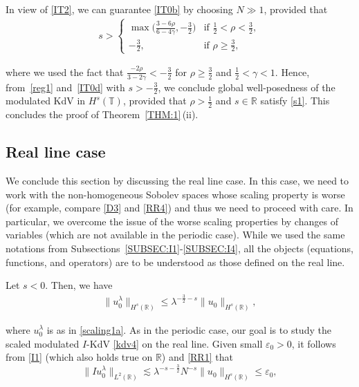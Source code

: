 \documentclass[letterpaper, 11pt,  reqno]{amsart}
\newcommand{\1}{\hspace{0.5mm}\text{I}\hspace{0.5mm}}
\newcommand{\noi}{\noindent}
\newcommand{\R}{\mathbb{R}}
\newcommand{\T}{\mathbb{T}}
\newcommand{\eps}{\varepsilon}
\newcommand{\g}{\gamma}
\newcommand{\ld}{\lambda}
\newcommand{\les}{\lesssim}
\numberwithin{equation}{section}
\numberwithin{theorem}{section}
\begin{document}
\noi
In view of  \eqref{IT2}, 
we  can  guarantee \eqref{IT0b} by choosing $N \gg 1$, 
provided that 
\begin{align}
s > 
\begin{cases}
\max \big(\frac {3-6\rho }{6 - 4\g}, - \frac 32\big)& \text{if } \frac 12 < \rho < \frac 32, \\
- \frac 32, & \text{if }  \rho \ge \frac 32, 
\end{cases}
\label{IT0d}
\end{align}

\noi
where we used the fact that 
$\frac{-2\rho}{3 - 2\g}  < -\frac 32$ for 
 $\rho \ge \frac 32$ and
$ \frac 12< \g < 1$.
Hence, 
from~\eqref{reg1} and~\eqref{IT0d} with $ s > - \frac 32$, 
we conclude 
global well-posedness of the modulated KdV in $H^s(\T)$, 
provided that 
$\rho > \frac 12$ and $s\in \R$
satisfy \eqref{s1}.
This concludes the proof of Theorem~\ref{THM:1}\,(ii).








\subsection{Real line case}
\label{SUBSEC:I5}


We conclude this section by discussing the real line case.
In this case, we need to work with the non-homogeneous Sobolev spaces whose
scaling property is worse
(for example, compare \eqref{D3} and \eqref{RR4})
and thus we need to proceed with care.
In particular, we overcome the issue of the worse scaling properties
by changes of variables
(which are not available in the periodic case).
While we used the same notations from Subsections~\ref{SUBSEC:I1}-\ref{SUBSEC:I4}, 
 all the objects 
(equations, functions, and operators) are 
to be understood as those defined on the real line.






Let $s < 0$.
Then, we have 
\begin{align}
\|u_0^\ld\|_{ H^s(\R)}
\le  \ld^{-\frac 32 - s} \|u_0\|_{ H^s(\R)}, 
\label{RR1}
\end{align}

\noi
where $u_0^\ld$ is as in \eqref{scaling1a}.
As in the periodic case, 
our goal is to study the scaled modulated $I$-KdV \eqref{kdv4}
on the real line.
Given small $\eps_0 > 0$, it follows from 
\eqref{I1} (which also holds true on $\R$)
and  \eqref{RR1} that
\begin{equation*}
 \| I  u_0^{\ld} \|_{L^2(\R) }
 \les \ld^{-s-\frac 32} N^{-s} \|  u_0  \|_{H^{s}(\R)}
 \le \eps_0 , 
\end{equation*}
\end{document}
